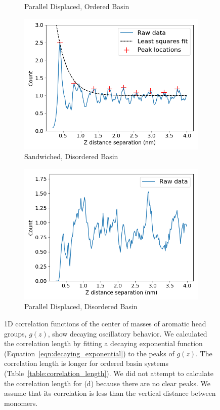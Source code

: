 \documentclass[journal=jpcbfk,manusciprt=article]{achemso}
\begin{document}
\begin{figure}[!htb]
\begin{subfigure}{0.45\textwidth}
  \caption{Parallel Displaced, Ordered Basin}\label{fig:z_correlation_offset}
  \end{subfigure}  
  \begin{subfigure}{0.45\textwidth}
  \centering
  \includegraphics[width=\textwidth]{z_correlation_sandwich_disordered.png}
  \caption{Sandwiched, Disordered Basin}\label{fig:z_correlation_sandwich_disordered}
  \end{subfigure}  
  \begin{subfigure}{0.45\textwidth}
  \centering
  \includegraphics[width=\textwidth]{z_correlation_offset_disordered.png}
  \caption{Parallel Displaced, Disordered Basin}\label{fig:z_correlation_offset_disordered}
  \end{subfigure}  
  \caption{1D correlation functions of the center of masses of aromatic head groups, $g(z)$, show
  decaying oscillatory behavior. We calculated the correlation length by fitting a decaying exponential
  function (Equation~\ref{eqn:decaying_exponential}) to the peaks of $g(z)$. The correlation length is
  longer for ordered basin systems (Table~\ref{table:correlation_length}).
  We did not attempt to calculate the correlation length for (d) because there are no clear peaks. We 
  assume that its correlation is less than the vertical distance between monomers.}\label{fig:correlation}
  \end{figure}
  
\end{document}
